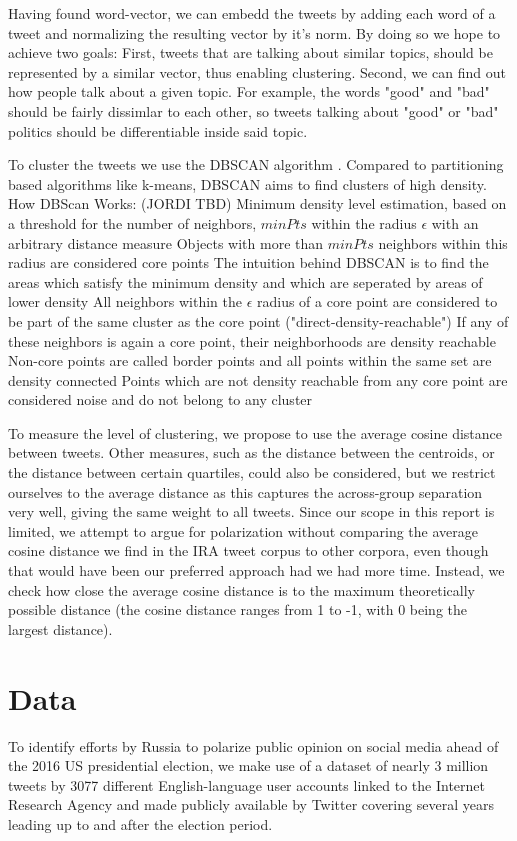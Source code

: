 \documentclass[12pt, authoryear]{elsarticle}
\begin{document}
Having found word-vector, we can embedd the tweets by adding each word of a tweet and normalizing the resulting vector by it's norm. By doing so we hope to achieve two goals: First, tweets that are talking about similar topics, should be represented by a similar vector, thus enabling clustering. Second, we can find out how people talk about a given topic. For example, the words "good" and "bad" should be fairly dissimlar to each other, so tweets talking about "good" or "bad" politics should be differentiable inside said topic. 

To cluster the tweets we use the DBSCAN algorithm \cite{ester1996density}. Compared to partitioning based algorithms like k-means, DBSCAN aims to find clusters of high density. 
How DBScan Works: (JORDI TBD)
Minimum density level estimation, based on a threshold for the number of neighbors, $minPts$ within the radius $\epsilon$ with an arbitrary distance measure
Objects with more than $minPts$ neighbors within this radius are considered core points
The intuition behind DBSCAN is to find the areas which satisfy the minimum density and which are seperated by areas of lower density
All neighbors within the $\epsilon$ radius of a core point are considered to be part of the same cluster as the core point ("direct-density-reachable")
If any of these neighbors is again a core point, their neighborhoods are density reachable
Non-core points are called border points and all points within the same set are density connected
Points which are not density reachable from any core point are considered noise and do not belong to any cluster



To measure the level of clustering, we propose to use the average cosine distance between tweets. Other measures, such as the distance between the centroids, or the distance between certain quartiles, could also be considered, but we restrict ourselves to the average distance as this captures the across-group separation very well, giving the same weight to all tweets. Since our scope in this report is limited, we attempt to argue for polarization without comparing the average cosine distance we find in the IRA tweet corpus to other corpora, even though that would have been our preferred approach had we had more time. Instead, we check how close the average cosine distance is to the maximum theoretically possible distance (the cosine distance ranges from 1 to -1, with 0 being the largest distance).

\section{Data}
To identify efforts by Russia to polarize public opinion on social media ahead of the 2016 US presidential election, we make use of a dataset of nearly 3 million tweets by 3077 different English-language user accounts linked to the Internet Research Agency and made publicly available by Twitter covering several years leading up to and after the election period.
\end{document}
